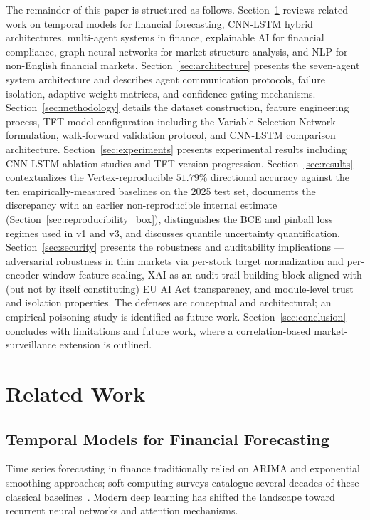 \documentclass[conference]{IEEEtran}
\begin{document}
The remainder of this paper is structured as follows. Section~\ref{sec:related} reviews related work on temporal models for financial forecasting, CNN-LSTM hybrid architectures, multi-agent systems in finance, explainable AI for financial compliance, graph neural networks for market structure analysis, and NLP for non-English financial markets. Section~\ref{sec:architecture} presents the seven-agent system architecture and describes agent communication protocols, failure isolation, adaptive weight matrices, and confidence gating mechanisms. Section~\ref{sec:methodology} details the dataset construction, feature engineering process, TFT model configuration including the Variable Selection Network formulation, walk-forward validation protocol, and CNN-LSTM comparison architecture. Section~\ref{sec:experiments} presents experimental results including CNN-LSTM ablation studies and TFT version progression. Section~\ref{sec:results} contextualizes the Vertex-reproducible $51.79\%$ directional accuracy against the ten empirically-measured baselines on the 2025 test set, documents the discrepancy with an earlier non-reproducible internal estimate (Section~\ref{sec:reproducibility_box}), distinguishes the BCE and pinball loss regimes used in v1 and v3, and discusses quantile uncertainty quantification. Section~\ref{sec:security} presents the robustness and auditability implications --- adversarial robustness in thin markets via per-stock target normalization and per-encoder-window feature scaling, XAI as an audit-trail building block aligned with (but not by itself constituting) EU AI Act transparency, and module-level trust and isolation properties. The defenses are conceptual and architectural; an empirical poisoning study is identified as future work. Section~\ref{sec:conclusion} concludes with limitations and future work, where a correlation-based market-surveillance extension is outlined.

\section{Related Work}\label{sec:related}

\subsection{Temporal Models for Financial Forecasting}

Time series forecasting in finance traditionally relied on ARIMA and exponential smoothing approaches; soft-computing surveys catalogue several decades of these classical baselines~\cite{ref:emerging_markets}. Modern deep learning has shifted the landscape toward recurrent neural networks and attention mechanisms. 
\end{document}
